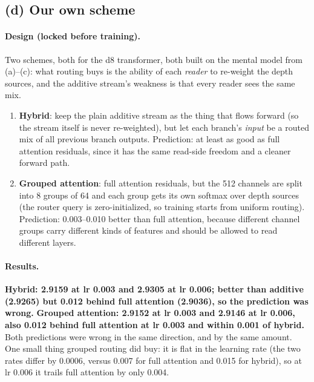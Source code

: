 \subsection*{(d) Our own scheme}
\paragraph{Design (locked before training).} Two schemes, both for the d8 transformer, both built on the mental model from (a)--(c): what routing buys is the ability of each \emph{reader} to re-weight the depth sources, and the additive stream's weakness is that every reader sees the same mix.

\begin{enumerate}[nosep]
\item \textbf{Hybrid}: keep the plain additive stream as the thing that flows forward (so the stream itself is never re-weighted), but let each branch's \emph{input} be a routed mix of all previous branch outputs. Prediction: at least as good as full attention residuals, since it has the same read-side freedom and a cleaner forward path.
\item \textbf{Grouped attention}: full attention residuals, but the 512 channels are split into 8 groups of 64 and each group gets its own softmax over depth sources (the router query is zero-initialized, so training starts from uniform routing). Prediction: 0.003--0.010 better than full attention, because different channel groups carry different kinds of features and should be allowed to read different layers.
\end{enumerate}

\paragraph{Results.} \textbf{Hybrid: 2.9159 at lr 0.003 and 2.9305 at lr 0.006; better than additive (2.9265) but 0.012 behind full attention (2.9036), so the prediction was wrong.} \textbf{Grouped attention: 2.9152 at lr 0.003 and 2.9146 at lr 0.006, also 0.012 behind full attention at lr 0.003 and within 0.001 of hybrid.} Both predictions were wrong in the same direction, and by the same amount. One small thing grouped routing did buy: it is flat in the learning rate (the two rates differ by 0.0006, versus 0.007 for full attention and 0.015 for hybrid), so at lr 0.006 it trails full attention by only 0.004.

